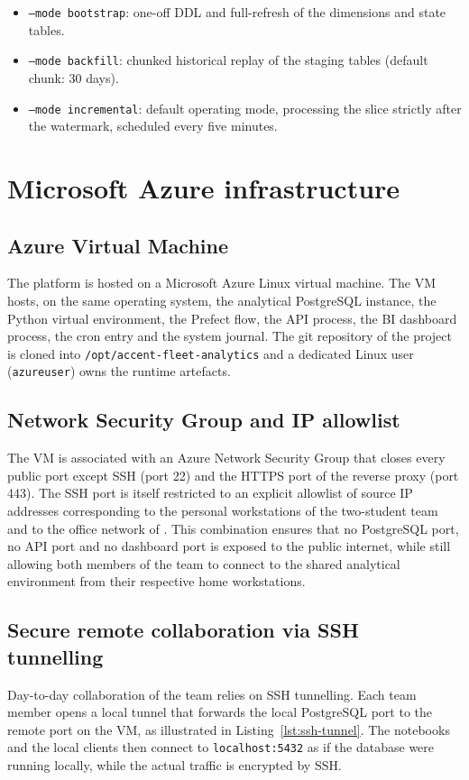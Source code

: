 \begin{itemize}
    \item \texttt{--mode bootstrap}: one-off DDL and full-refresh of the dimensions and state tables.
    \item \texttt{--mode backfill}: chunked historical replay of the staging tables (default chunk: 30 days).
    \item \texttt{--mode incremental}: default operating mode, processing the slice strictly after the watermark, scheduled every five minutes.
\end{itemize}

\section{Microsoft Azure infrastructure}

\subsection{Azure Virtual Machine}
The platform is hosted on a Microsoft Azure Linux virtual machine. The VM hosts, on the same operating system, the analytical PostgreSQL instance, the Python virtual environment, the Prefect flow, the API process, the BI dashboard process, the cron entry and the system journal. The git repository of the project is cloned into \texttt{/opt/accent-fleet-analytics} and a dedicated Linux user (\texttt{azureuser}) owns the runtime artefacts.

\subsection{Network Security Group and IP allowlist}
The VM is associated with an Azure Network Security Group that closes every public port except SSH (port 22) and the HTTPS port of the reverse proxy (port 443). The SSH port is itself restricted to an explicit allowlist of source IP addresses corresponding to the personal workstations of the two-student team and to the office network of \hostorg. This combination ensures that no PostgreSQL port, no API port and no dashboard port is exposed to the public internet, while still allowing both members of the team to connect to the shared analytical environment from their respective home workstations.

\subsection{Secure remote collaboration via SSH tunnelling}
Day-to-day collaboration of the team relies on SSH tunnelling. Each team member opens a local tunnel that forwards the local PostgreSQL port to the remote port on the VM, as illustrated in Listing~\ref{lst:ssh-tunnel}. The notebooks and the local clients then connect to \texttt{localhost:5432} as if the database were running locally, while the actual traffic is encrypted by SSH.


